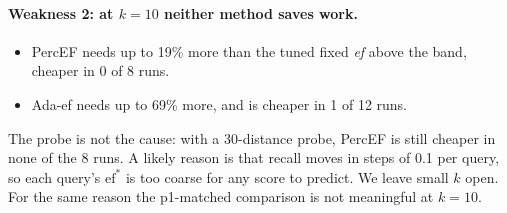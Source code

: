 \documentclass[twocolumn]{svjour3}
\newcommand{\ef}{\textit{ef}}
\begin{document}
\paragraph{Weakness 2: at $k = 10$ neither method saves work.}
\begin{itemize}
\item PercEF needs up to 19\% more than the tuned fixed \ef{} above the band, cheaper in 0 of 8 runs.
\item Ada-ef needs up to 69\% more, and is cheaper in 1 of 12 runs.
\end{itemize}
The probe is not the cause: with a 30-distance probe, PercEF is still cheaper in none of the 8 runs.
A likely reason is that recall moves in steps of 0.1 per query, so each query's $\mathrm{ef}^*$ is
too coarse for any score to predict. We leave small $k$ open. For the same reason the p1-matched
comparison is not meaningful at $k = 10$.
\end{document}
